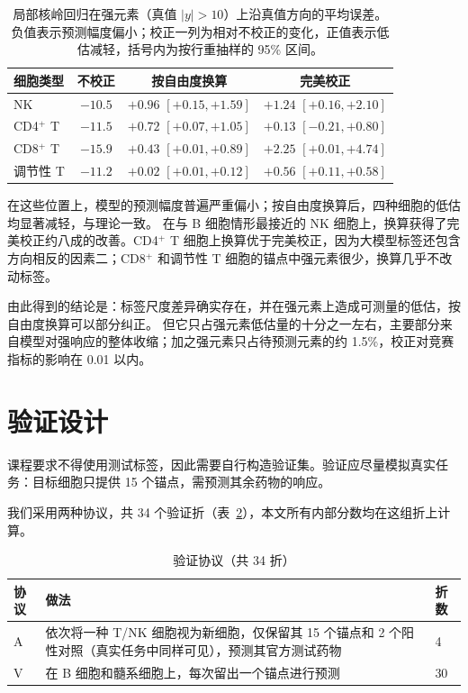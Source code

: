 \documentclass[11pt,a4paper]{article}
\begin{document}
\begin{table}[!ht]
\centering\small
\caption{局部核岭回归在强元素（真值 $|y|>10$）上沿真值方向的平均误差。负值表示预测幅度偏小；校正一列为相对不校正的变化，正值表示低估减轻，括号内为按行重抽样的 95\% 区间。}\label{tab:strong}
\begin{tabular}{@{}lccc@{}}
\toprule
细胞类型 & 不校正 & 按自由度换算 & 完美校正 \\
\midrule
NK & $-10.5$ & $+0.96$ $[+0.15, +1.59]$ & $+1.24$ $[+0.16, +2.10]$ \\
CD4$^+$ T & $-11.5$ & $+0.72$ $[+0.07, +1.05]$ & $+0.13$ $[-0.21, +0.80]$ \\
CD8$^+$ T & $-15.9$ & $+0.43$ $[+0.01, +0.89]$ & $+2.25$ $[+0.01, +4.74]$ \\
调节性 T & $-11.2$ & $+0.02$ $[+0.01, +0.12]$ & $+0.56$ $[+0.11, +0.58]$ \\
\bottomrule
\end{tabular}
\end{table}

在这些位置上，模型的预测幅度普遍严重偏小；按自由度换算后，四种细胞的低估均显著减轻，与理论一致。
在与 B 细胞情形最接近的 NK 细胞上，换算获得了完美校正约八成的改善。CD4$^+$ T 细胞上换算优于完美校正，因为大模型标签还包含方向相反的因素二；CD8$^+$ 和调节性 T 细胞的锚点中强元素很少，换算几乎不改动标签。

由此得到的结论是：标签尺度差异确实存在，并在强元素上造成可测量的低估，按自由度换算可以部分纠正。
但它只占强元素低估量的十分之一左右，主要部分来自模型对强响应的整体收缩；加之强元素只占待预测元素的约 1.5\%，校正对竞赛指标的影响在 0.01 以内。

\section{验证设计}

课程要求不得使用测试标签，因此需要自行构造验证集。验证应尽量模拟真实任务：目标细胞只提供 15 个锚点，需预测其余药物的响应。

我们采用两种协议，共 34 个验证折（表~\ref{tab:protocols}），本文所有内部分数均在这组折上计算。

\begin{table}[H]
\centering\small
\caption{验证协议（共 34 折）}\label{tab:protocols}
\begin{tabular}{@{}lp{}l@{}}
\toprule
协议 & 做法 & 折数 \\
\midrule
A & 依次将一种 T/NK 细胞视为新细胞，仅保留其 15 个锚点和 2 个阳性对照（真实任务中同样可见），预测其官方测试药物 & 4 \\
V & 在 B 细胞和髓系细胞上，每次留出一个锚点进行预测 & 30 \\
\bottomrule
\end{tabular}
\end{table}
\end{document}
